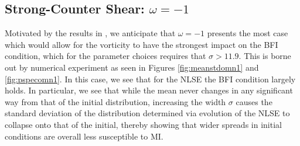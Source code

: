 \documentclass[a4paper,11pt]{article}
\begin{document}
\subsection*{Strong-Counter Shear: $\omega = -1$}

Motivated by the results in \cite{curtis8}, we anticipate that $\omega=-1$ presents the most case which would allow for the vorticity to have the strongest impact on the BFI condition, which for the parameter choices requires that $\sigma > 11.9$.  This is borne out by numerical experiment as seen in Figures \ref{fig:meanstdomn1} and \ref{fig:pspecomn1}.  In this case, we see that for the NLSE the BFI condition largely holds.  In particular, we see that while the mean never changes in any significant way from that of the initial distribution, increasing the width $\sigma$ causes the standard deviation of the distribution determined via evolution of the NLSE to collapse onto that of the initial, thereby showing that wider spreads in initial conditions are overall less susceptible to MI.   
\end{document}
